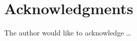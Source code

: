 \documentclass[sigconf,balance,nonacm,authordraft]{acmart}
\begin{document}
\section*{Acknowledgments}
The author would like to acknowledge \ldots



\end{document}
